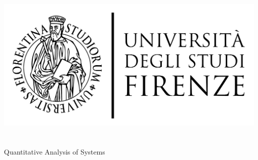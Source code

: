 \begin{titlepage}
	\begin{center}
   	\large
      \hfill
      \vfill
      \begingroup
         \includegraphics[scale=0.15]{logo/LOGO}\\
			\myFaculty \\
			\myDegree \\ 
			\vspace{0.5cm}
         \vspace{0.5cm}    
         Quantitative Analysis of Systems  
      \endgroup 
      \vfill 
      \begingroup
      	\spacedallcaps{\myItalianTitle} \\ $\ $\\
	\bigskip
      \endgroup
      \spacedlowsmallcaps{\myName}
      \vfill
      \vfill
      \vfill
      \myTime
      \vfill                      
	\end{center}        
\end{titlepage}